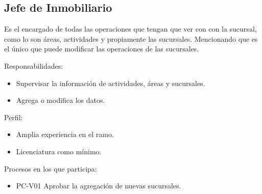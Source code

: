 \begin{Usuario}{\subsection{Jefe de Inmobiliario}}{
		Es el encargado de todas las operaciones que tengan que ver con con la sucursal, como lo son áreas, actividades y propiamente las sucursales. Mencionando que es el único que puede modificar las operaciones de las sucursales.
	}
		\item[Responsabilidades:] \cdtEmpty
	\begin{itemize}
		\item Supervisar la información de actividades, áreas y sucursales.
		\item Agrega o modifica los datos.
	\end{itemize}
	
	\item[Perfil:] \cdtEmpty
	\begin{itemize}
		\item Amplia experiencia en el ramo.
		\item Licenciatura como mínimo.
	\end{itemize}
	\item[Procesos en los que participa:] \cdtEmpty
	\begin{itemize}
		\item PC-V01 Aprobar la agregación de nuevas sucursales.
		
	\end{itemize}
\end{Usuario}



